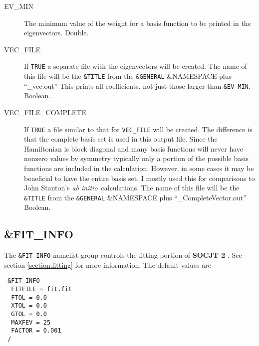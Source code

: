 \documentclass{article}
\newcommand{\ai}{{\it ab initio}}
\newcommand{\socjttwo}{{\bf SOCJT 2}}
\begin{document}
\begin{description}
\item[EV\_MIN] The minimum value of the weight for a basis function to be 
  printed in the eigenvectors. Double.

\item[VEC\_FILE] If {\tt TRUE} a separate file with the eigenvectors will be created. The name of this file will be the {\tt \&TITLE} from the {\tt \&GENERAL} \&NAMESPACE plus ``\_vec.out'' This prints all coefficients, not just those larger than {\tt \&EV\_MIN}. Boolean.

\item[VEC\_FILE\_COMPLETE] If {\tt TRUE} a file similar to that for {\tt VEC\_FILE} will be created. The difference is that the complete basis set is used in this output file. Since the Hamiltonian is block diagonal and many basis functions will never have nonzero values by symmetry typically only a portion of the possible basis functions are included in the calculation. However, in some cases it may be beneficial to have the entire basis set. I mostly used this for comparisons to John Stanton's \ai\ calculations. The name of this file will be the {\tt \&TITLE} from the {\tt \&GENERAL} \&NAMESPACE plus ``\_CompleteVector.out'' Boolean.
\end{description}


\subsection{\&FIT\_INFO} \label{fitinfo}

The {\tt \&FIT\_INFO} namelist group controls the fitting portion of \socjttwo
. See section \ref{section:fitting} for more information. The default values are

\begin{verbatim}
 &FIT_INFO
  FITFILE = fit.fit
  FTOL = 0.0
  XTOL = 0.0
  GTOL = 0.0
  MAXFEV = 25
  FACTOR = 0.001
 /
\end{verbatim}
\end{document}
